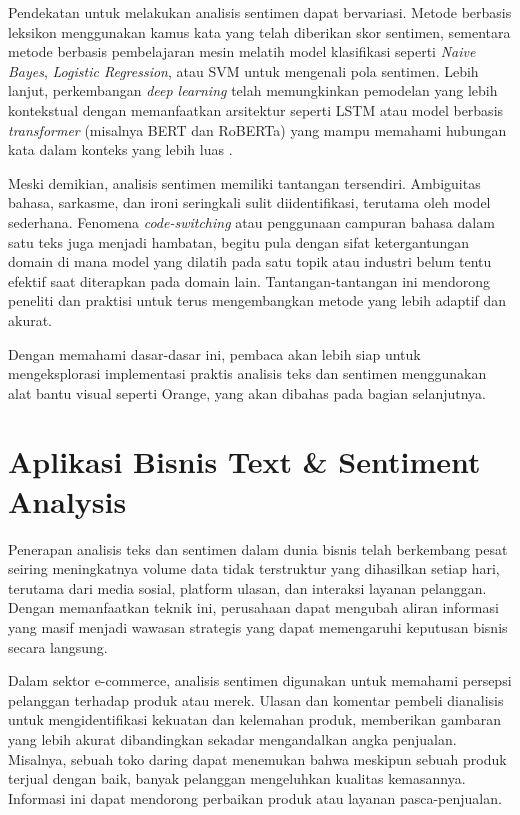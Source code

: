 Pendekatan untuk melakukan analisis sentimen dapat bervariasi. Metode berbasis leksikon menggunakan kamus kata yang telah diberikan skor sentimen, sementara metode berbasis pembelajaran mesin melatih model klasifikasi seperti \textit{Naive Bayes}, \textit{Logistic Regression}, atau SVM untuk mengenali pola sentimen. Lebih lanjut, perkembangan \textit{deep learning} telah memungkinkan pemodelan yang lebih kontekstual dengan memanfaatkan arsitektur seperti LSTM atau model berbasis \textit{transformer} (misalnya BERT dan RoBERTa) yang mampu memahami hubungan kata dalam konteks yang lebih luas \cite{yang2019xlnet}.

Meski demikian, analisis sentimen memiliki tantangan tersendiri. Ambiguitas bahasa, sarkasme, dan ironi seringkali sulit diidentifikasi, terutama oleh model sederhana. Fenomena \textit{code-switching} atau penggunaan campuran bahasa dalam satu teks juga menjadi hambatan, begitu pula dengan sifat ketergantungan domain di mana model yang dilatih pada satu topik atau industri belum tentu efektif saat diterapkan pada domain lain. Tantangan-tantangan ini mendorong peneliti dan praktisi untuk terus mengembangkan metode yang lebih adaptif dan akurat.

Dengan memahami dasar-dasar ini, pembaca akan lebih siap untuk mengeksplorasi implementasi praktis analisis teks dan sentimen menggunakan alat bantu visual seperti Orange, yang akan dibahas pada bagian selanjutnya.


\section{Aplikasi Bisnis Text \& Sentiment Analysis}

Penerapan analisis teks dan sentimen dalam dunia bisnis telah berkembang pesat seiring meningkatnya volume data tidak terstruktur yang dihasilkan setiap hari, terutama dari media sosial, platform ulasan, dan interaksi layanan pelanggan. Dengan memanfaatkan teknik ini, perusahaan dapat mengubah aliran informasi yang masif menjadi wawasan strategis yang dapat memengaruhi keputusan bisnis secara langsung.

Dalam sektor e-commerce, analisis sentimen digunakan untuk memahami persepsi pelanggan terhadap produk atau merek. Ulasan dan komentar pembeli dianalisis untuk mengidentifikasi kekuatan dan kelemahan produk, memberikan gambaran yang lebih akurat dibandingkan sekadar mengandalkan angka penjualan. Misalnya, sebuah toko daring dapat menemukan bahwa meskipun sebuah produk terjual dengan baik, banyak pelanggan mengeluhkan kualitas kemasannya. Informasi ini dapat mendorong perbaikan produk atau layanan pasca-penjualan.

